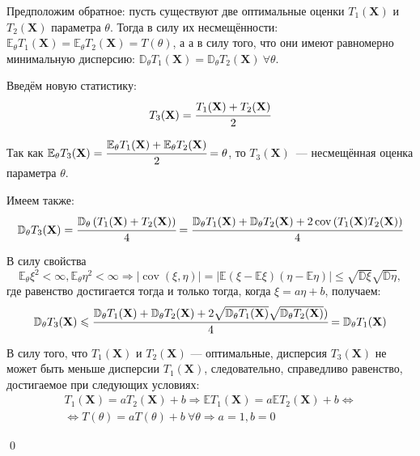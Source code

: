 \documentclass[oneside,final,14pt]{extreport}
\renewenvironment{proof}{{\bfseries Доказательство.}}{\qed}
\theoremstyle{definition}
\begin{document}
\begin{proof}
Предположим обратное: пусть существуют две оптимальные оценки $T_1(\mathbf{X})$ и $T_2(\mathbf{X})$ параметра $\theta$. Тогда в силу их несмещённости: $\mathbb{E}_{\theta} T_{1}(\mathbf{X})=\mathbb{E}_{\theta} T_{2}(\mathbf{X})=T(\theta)$, а а в силу того, что они имеют равномерно минимальную дисперсию: $\mathbb{D}_{\theta} T_{1}(\mathbf{X})=\mathbb{D}_{\theta} T_{2}(\mathbf{X})~ \forall \theta$.

Введём новую статистику: 
\begin{equation}
    T_{3}(\mathbf{X})=\cfrac{T_{1}(\mathbf{X})+T_{2}(\mathbf{X})}{2}
\end{equation}

Так как $\mathbb{E}_{\theta} T_{3}(\mathbf{X})=\cfrac{\mathbb{E}_{\theta} T_{1}(\mathbf{X})+\mathbb{E}_{\theta} T_{2}(\mathbf{X})}{2}=\theta$, то $T_{3}(\mathbf{X})$~--- несмещённая оценка параметра $\theta$.

Имеем также:
\begin{equation*}
    \mathbb{D}_{\theta} T_{3}(\mathbf{X})=\cfrac{\mathbb{D}_{\theta}\left(T_{1}(\mathbf{X})+T_{2}(\mathbf{X})\right)}{4} =
    \cfrac{\mathbb{D}_{\theta} T_{1}(\mathbf{X})+\mathbb{D}_{\theta} T_{2}(\mathbf{X})+2 \operatorname{cov}\left(T_{1}(\mathbf{X}) T_{2}(\mathbf{X})\right)}{4}
\end{equation*}

В силу свойства
\begin{equation*}
    \mathbb{E}_{\theta} \xi^{2}<\infty, \mathbb{E}_{\theta} \eta^{2}<\infty \Rightarrow|\operatorname{cov}(\xi, \eta)| = | \mathbb{E}(\xi-\mathbb{E} \xi)(\eta-\mathbb{E} \eta)| \leqslant \sqrt{\mathbb{D} \xi} \sqrt{\mathbb{D} \eta},
\end{equation*}
где равенство достигается тогда и только тогда, когда $\xi=a \eta+b$, получаем:
\begin{equation*}
    \mathbb{D}_{\theta} T_{3}(\mathbf{X}) \leqslant \cfrac{\mathbb{D}_{\theta} T_{1}(\mathbf{X})+\mathbb{D}_{\theta} T_{2}(\mathbf{X})+2 \sqrt{\mathbb{D}_{\theta} T_{1}(\mathbf{X})} \sqrt{\mathbb{D}_{\theta} T_{2}(\mathbf{X})})}{4} =\mathbb{D}_{\theta} T_{1}(\mathbf{X})
\end{equation*}

В силу того, что $T_1(\mathbf{X})$ и $T_2(\mathbf{X})$ — оптимальные, дисперсия $T_3(\mathbf{X})$ не может быть меньше дисперсии $T_1(\mathbf{X})$, следовательно, справедливо равенство, достигаемое при следующих условиях:
\begin{equation*}
\begin{aligned}
    T_{1}(\mathbf{X})=a T_{2}(\mathbf{X})+b \Rightarrow \mathbb{E} T_{1}(\mathbf{X})
    = a \mathbb{E} T_{2}(\mathbf{X})+b 
    \Leftrightarrow \\
    \Leftrightarrow T(\theta) = a T(\theta)+b~ \forall \theta \Rightarrow a = 1, b = 0
\end{aligned}
\end{equation*}

\end{proof}
\end{document}
